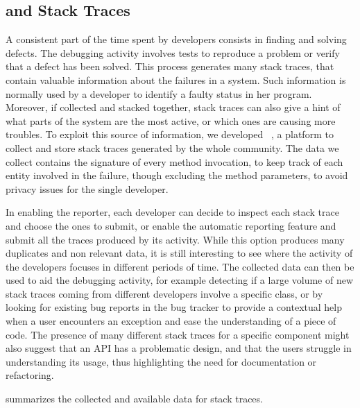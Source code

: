 \subsection{\slr and Stack Traces}\label{sub:stacktraces}

A consistent part of the time spent by developers consists in finding and solving defects.
The debugging activity involves tests to reproduce a problem or verify that a defect has been solved.
This process generates many stack traces, that contain valuable information about the failures in a system.
Such information is normally used by a developer to identify a faulty status in her program.
Moreover, if collected and stacked together, stack traces can also give a hint of what parts of the system are the most active, or which ones are causing more troubles.
To exploit this source of information, we developed \slr~\cite{DalS2015a}, a platform to collect and store stack traces generated by the whole \pha community.
The data we collect contains the signature of every method invocation, to keep track of each entity involved in the failure, though excluding the method parameters, to avoid privacy issues for the single developer.

In enabling the reporter, each developer can decide to inspect each stack trace and choose the ones to submit, or enable the automatic reporting feature and submit all the traces produced by its activity.
While this option produces many duplicates and non relevant data, it is still interesting to see where the activity of the developers focuses in different periods of time.
The collected data can then be used to aid the debugging activity, for example detecting if a large volume of new stack traces coming from different developers involve a specific class, or by looking for existing bug reports in the bug tracker to provide a contextual help when a user encounters an exception and ease the understanding of a piece of code.
The presence of many different stack traces for a specific component might also suggest that an API has a problematic design, and that the users struggle in understanding its usage, thus highlighting the need for documentation or refactoring.

 summarizes the collected and available data for stack traces.

